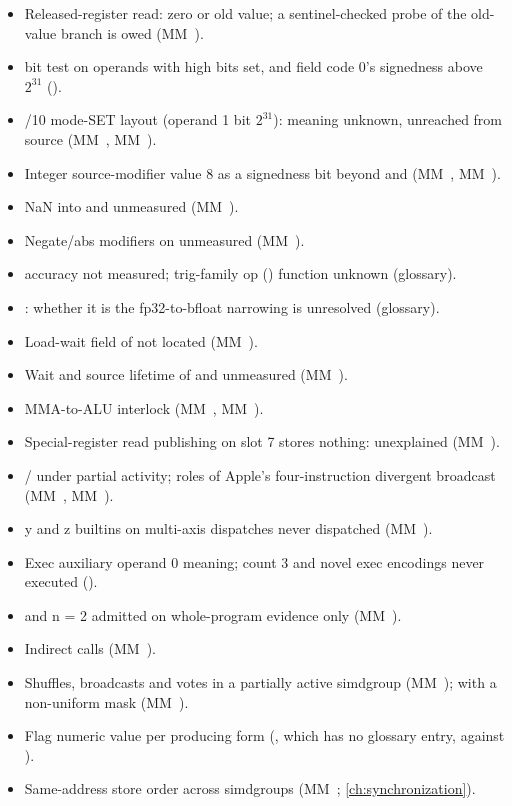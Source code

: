 \begin{itemize}
\item Released-register read: zero or old value; a sentinel-checked probe of the old-value branch is owed (MM~).
\item {} bit test on operands with high bits set, and field code 0's signedness above $2^{31}$ ().
\item {}/10 mode-SET layout (operand 1 bit $2^{31}$): meaning unknown, unreached from source (MM~, MM~).
\item Integer source-modifier value 8 as a signedness bit beyond  and  (MM~, MM~).
\item NaN into  and  unmeasured (MM~).
\item Negate/abs modifiers on  unmeasured (MM~).
\item {} accuracy not measured; trig-family op () function unknown (glossary).
\item {}: whether it is the fp32-to-bfloat narrowing is unresolved (glossary).
\item Load-wait field of  not located (MM~).
\item Wait and source lifetime of  and  unmeasured (MM~).
\item MMA-to-ALU interlock (MM~, MM~).
\item Special-register read publishing on slot 7 stores nothing: unexplained (MM~).
\item {} /  under partial activity; roles of Apple's four-instruction divergent broadcast (MM~, MM~).
\item y and z builtins on multi-axis dispatches never dispatched (MM~).
\item Exec auxiliary operand 0 meaning; count 3 and novel exec encodings never executed ().
\item {} and  n = 2 admitted on whole-program evidence only (MM~).
\item Indirect calls (MM~).
\item Shuffles, broadcasts and votes in a partially active simdgroup (MM~);  with a non-uniform mask (MM~).
\item Flag numeric value per producing form (, which has no glossary entry, against ).
\item Same-address store order across simdgroups (MM~; \cref{ch:synchronization}).
\end{itemize}

